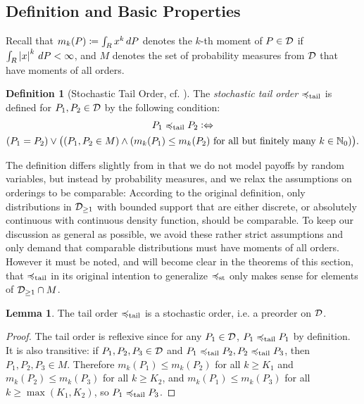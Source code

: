 \documentclass[a4paper]{scrreprt}
\newcommand{\M}{M}
\theoremstyle{definition}
\newtheorem{lemma}[thm]{Lemma} %
\newtheorem{defn}[thm]{Definition} %
\begin{document}
    \subsection{Definition and Basic Properties}
    \label{subsec:tailOrderDefinitionAndBasicProperties}
    Recall that $m_k(P) \coloneqq \int_{R} x^k \, dP$ denotes the $k$-th moment of $P \in \mathcal{D}$ if $\int_{R} \left| x \right|^k \, dP < \infty$, and $M$ denotes the set of probability measures from $\mathcal{D}$ that have moments of all orders.
    \begin{defn}[{Stochastic Tail Order, cf. \cite[Definition 2]{bib:rassTotalOrderingOnLossDistributions}}]
        The \emph{stochastic tail order} $\preccurlyeq_{\text{tail}}$ is defined for $P_1, P_2 \in \mathcal{D}$ by the following condition:
        \begin{multline*}
            P_1 \leqtail P_2 \colonlra \\
            (P_1 = P_2) \vee \bigpars{(P_1, P_2 \in \M) \wedge (m_k(P_1) \leq m_k(P_2) \text{ for all but finitely many $k \in \N_0$})}.
        \end{multline*}
    \end{defn}
    The definition differs slightly from \cite[Definition 2]{bib:rassTotalOrderingOnLossDistributions} in that we do not model payoffs by random variables, but instead by probability measures, and we relax the assumptions on orderings to be comparable:
    According to the original definition, only distributions in $\mathcal{D}_{\geq1}$ with bounded support that are either discrete, or absolutely continuous with continuous density function, should be comparable. To keep our discussion as general as possible, we avoid these rather strict assumptions and only demand that comparable distributions must have moments of all orders.
    However it must be noted, and will become clear in the theorems of this section, that $\preccurlyeq_{\text{tail}}$ in its original intention to generalize $\preccurlyeq_{\text{st}}$ only makes sense for elements of $\mathcal{D}_{\geq1} \cap M$.

    \begin{lemma}
        The tail order $\preccurlyeq_{\text{tail}}$ is a stochastic order, i.e. a preorder on $\mathcal{D}$.
    \end{lemma}
    \begin{proof}
        The tail order is reflexive since for any $P_1 \in \mathcal{D}$, $P_1 \preccurlyeq_{\text{tail}} P_1$ by definition.
        It is also transitive: if $P_1, P_2, P_3 \in \mathcal{D}$ and $P_1 \preccurlyeq_{\text{tail}} P_2, P_2 \preccurlyeq_{\text{tail}} P_3$, then $P_1, P_2, P_3 \in M$.        
        Therefore $m_k(P_1) \leq m_k(P_2)$ for all $k \geq K_1$ and $m_k(P_2) \leq m_k(P_3)$ for all $k \geq K_2$, and $m_k(P_1) \leq m_k(P_3)$ for all $k \geq \max(K_1, K_2)$, so $P_1 \preccurlyeq_{\text{tail}} P_3$.
    \end{proof}
    
\end{document}
